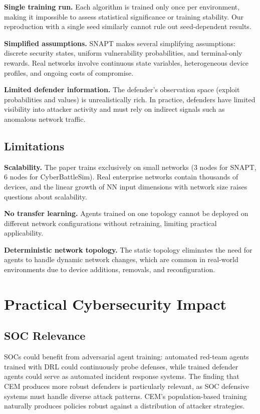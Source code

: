 \documentclass[conference, 10pt]{IEEEtran}
\begin{document}
\textbf{Single training run.} Each algorithm is trained only once per environment, making it impossible to assess statistical significance or training stability. Our reproduction with a single seed similarly cannot rule out seed-dependent results.

\textbf{Simplified assumptions.} SNAPT makes several simplifying assumptions: discrete security states, uniform vulnerability probabilities, and terminal-only rewards. Real networks involve continuous state variables, heterogeneous device profiles, and ongoing costs of compromise.

\textbf{Limited defender information.} The defender's observation space (exploit probabilities and values) is unrealistically rich. In practice, defenders have limited visibility into attacker activity and must rely on indirect signals such as anomalous network traffic.

\subsection{Limitations}

\textbf{Scalability.} The paper trains exclusively on small networks (3 nodes for SNAPT, 6 nodes for CyberBattleSim). Real enterprise networks contain thousands of devices, and the linear growth of NN input dimensions with network size raises questions about scalability.

\textbf{No transfer learning.} Agents trained on one topology cannot be deployed on different network configurations without retraining, limiting practical applicability.

\textbf{Deterministic network topology.} The static topology eliminates the need for agents to handle dynamic network changes, which are common in real-world environments due to device additions, removals, and reconfiguration.

\section{Practical Cybersecurity Impact}

\subsection{SOC Relevance}

SOCs could benefit from adversarial agent training: automated red-team agents trained with DRL could continuously probe defenses, while trained defender agents could serve as automated incident response systems. The finding that CEM produces more robust defenders is particularly relevant, as SOC defensive systems must handle diverse attack patterns. CEM's population-based training naturally produces policies robust against a distribution of attacker strategies.
\end{document}
